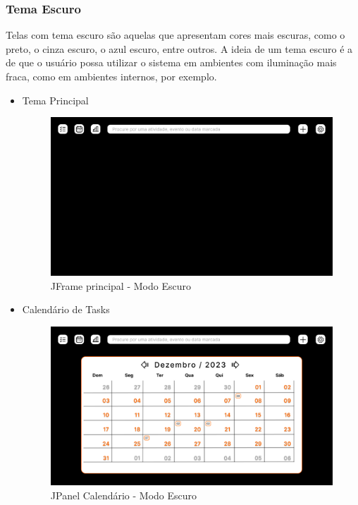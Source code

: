 \documentclass[a4paper,12pt]{article}
\begin{document}
\subsubsection{Tema Escuro}
Telas com tema escuro são aquelas que apresentam cores mais escuras, como o preto, o cinza escuro, o azul escuro, entre outros. A ideia de um tema escuro 
é a de que o usuário possa utilizar o sistema em ambientes com iluminação mais fraca, como em ambientes internos, por exemplo.
\begin{itemize}
	\item Tema Principal
	\begin{figure}[H]
		\centering
		\includegraphics[scale=0.20]{prototypes/dark/Main Window.png}
		\caption{JFrame principal - Modo Escuro}
	\end{figure}

	\item Calendário de Tasks
	\begin{figure}[H]
		\centering
		\includegraphics[scale=0.20]{prototypes/dark/Calendar Panel Window.png}
		\caption{JPanel Calendário - Modo Escuro}
	\end{figure}	


\end{itemize}
\end{document}
